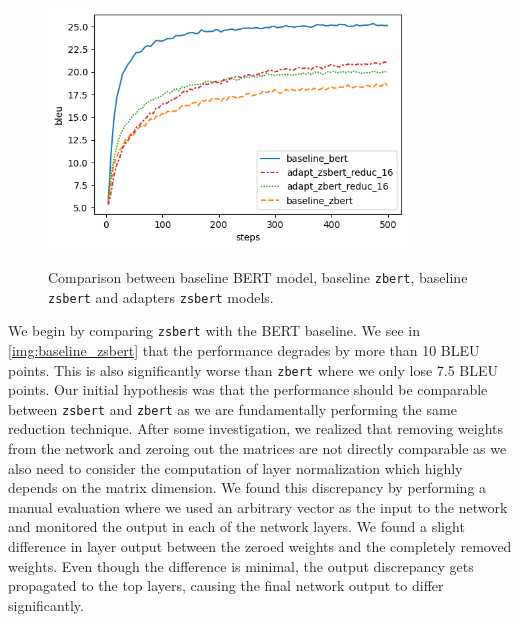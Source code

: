 \begin{figure}[]
    {\includegraphics[width=0.85\textwidth]{img/adapter_zsbert.png}}
    \centering
    \caption{Comparison between baseline BERT model, baseline \texttt{zbert}, baseline \texttt{zsbert} and adapters \texttt{zsbert} models.}
    \label{img:adapter_zsbert}
\end{figure}


We begin by comparing \texttt{zsbert} with the BERT baseline. We see in \cref{img:baseline_zsbert} that the performance degrades by more than 10 BLEU points. This is also significantly worse than \texttt{zbert} where we only lose 7.5 BLEU points. Our initial hypothesis was that the performance should be comparable between \texttt{zsbert} and \texttt{zbert} as we are fundamentally performing the same reduction technique. After some investigation, we realized that removing weights from the network and zeroing out the matrices are not directly comparable as we also need to consider the computation of layer normalization which highly depends on the matrix dimension. We found this discrepancy by performing a manual evaluation where we used an arbitrary vector as the input to the network and monitored the output in each of the network layers. We found a slight difference in layer output between the zeroed weights and the completely removed weights. Even though the difference is minimal, the output discrepancy gets propagated to the top layers, causing the final network output to differ significantly.

